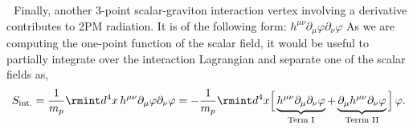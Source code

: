 \textbullet $\,\,$ Finally, another 3-point scalar-graviton interaction vertex involving a derivative contributes to 2PM radiation. It is of the following form: $h^{\mu\nu}\partial_{\mu}\varphi\partial_{\nu} \varphi$  As we are computing the one-point function of the scalar field, it would be useful to partially integrate over the interaction Lagrangian and separate one of the scalar fields as,
\begin{align}
    \begin{split}
        S_{\textrm{int.}}=\frac{1}{m_p}\rmint d^4x \,h^{\mu\nu} \partial_{\mu}\varphi\partial_{\nu}\varphi=-\frac{1}{m_p}\rmint d^4 x \Big[\underbrace{h^{\mu\nu}\partial_{\mu}\partial_{\nu}\varphi}_{\textrm{Term I}}+\underbrace{\partial_{\mu}h^{\mu\nu}\partial_{\nu}\varphi}_{\textrm{Terrm II}}\Big]\,\varphi.\label{5.22 m}
    \end{split}
\end{align}
